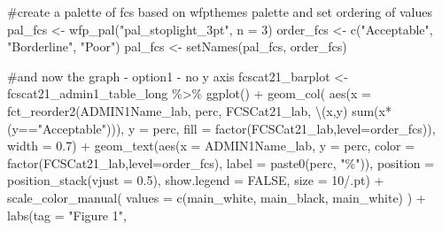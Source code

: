 \documentclass[
  letterpaper,
  DIV=11,
  numbers=noendperiod]{scrreprt}
\newenvironment{Shaded}{\begin{snugshade}}{\end{snugshade}}
\newcommand{\AttributeTok}[1]{\textcolor[rgb]{0.40,0.45,0.13}{#1}}
\newcommand{\CommentTok}[1]{\textcolor[rgb]{0.37,0.37,0.37}{#1}}
\newcommand{\ConstantTok}[1]{\textcolor[rgb]{0.56,0.35,0.01}{#1}}
\newcommand{\DecValTok}[1]{\textcolor[rgb]{0.68,0.00,0.00}{#1}}
\newcommand{\FloatTok}[1]{\textcolor[rgb]{0.68,0.00,0.00}{#1}}
\newcommand{\FunctionTok}[1]{\textcolor[rgb]{0.28,0.35,0.67}{#1}}
\newcommand{\NormalTok}[1]{\textcolor[rgb]{0.00,0.23,0.31}{#1}}
\newcommand{\OtherTok}[1]{\textcolor[rgb]{0.00,0.23,0.31}{#1}}
\newcommand{\SpecialCharTok}[1]{\textcolor[rgb]{0.37,0.37,0.37}{#1}}
\newcommand{\StringTok}[1]{\textcolor[rgb]{0.13,0.47,0.30}{#1}}
\begin{document}
\begin{Shaded}
\begin{Highlighting}[]
\CommentTok{\#create a palette of fcs based on wfpthemes palette and set ordering of values}
\NormalTok{pal\_fcs }\OtherTok{\textless{}{-}} \FunctionTok{wfp\_pal}\NormalTok{(}\StringTok{"pal\_stoplight\_3pt"}\NormalTok{, }\AttributeTok{n =} \DecValTok{3}\NormalTok{)}
\NormalTok{order\_fcs }\OtherTok{\textless{}{-}} \FunctionTok{c}\NormalTok{(}\StringTok{"Acceptable"}\NormalTok{, }\StringTok{"Borderline"}\NormalTok{, }\StringTok{"Poor"}\NormalTok{)}
\NormalTok{pal\_fcs }\OtherTok{\textless{}{-}} \FunctionTok{setNames}\NormalTok{(pal\_fcs, order\_fcs)}

\CommentTok{\#and now the graph {-} option1 {-} no y axis }
\NormalTok{fcscat21\_barplot }\OtherTok{\textless{}{-}}\NormalTok{ fcscat21\_admin1\_table\_long }\SpecialCharTok{\%\textgreater{}\%} 
  \FunctionTok{ggplot}\NormalTok{() }\SpecialCharTok{+}
  \FunctionTok{geom\_col}\NormalTok{(}
    \FunctionTok{aes}\NormalTok{(}\AttributeTok{x =} \FunctionTok{fct\_reorder2}\NormalTok{(ADMIN1Name\_lab,}
\NormalTok{                         perc,  }
\NormalTok{                         FCSCat21\_lab,}
\NormalTok{                         \textbackslash{}(x,y) }\FunctionTok{sum}\NormalTok{(x}\SpecialCharTok{*}\NormalTok{(y}\SpecialCharTok{==}\StringTok{"Acceptable"}\NormalTok{))), }
        \AttributeTok{y =}\NormalTok{ perc,}
        \AttributeTok{fill =} \FunctionTok{factor}\NormalTok{(FCSCat21\_lab,}\AttributeTok{level=}\NormalTok{order\_fcs)), }
    \AttributeTok{width =} \FloatTok{0.7}\NormalTok{) }\SpecialCharTok{+}
  \FunctionTok{geom\_text}\NormalTok{(}\FunctionTok{aes}\NormalTok{(}\AttributeTok{x =}\NormalTok{ ADMIN1Name\_lab,}
                \AttributeTok{y =}\NormalTok{ perc,}
                \AttributeTok{color =} \FunctionTok{factor}\NormalTok{(FCSCat21\_lab,}\AttributeTok{level=}\NormalTok{order\_fcs),}
                \AttributeTok{label =} \FunctionTok{paste0}\NormalTok{(perc, }\StringTok{"\%"}\NormalTok{)),}
            \AttributeTok{position =} \FunctionTok{position\_stack}\NormalTok{(}\AttributeTok{vjust =} \FloatTok{0.5}\NormalTok{),}
            \AttributeTok{show.legend =} \ConstantTok{FALSE}\NormalTok{,}
            \AttributeTok{size =} \DecValTok{10}\SpecialCharTok{/}\NormalTok{.pt) }\SpecialCharTok{+}
  \FunctionTok{scale\_color\_manual}\NormalTok{(}
    \AttributeTok{values =} \FunctionTok{c}\NormalTok{(main\_white, main\_black, main\_white)}
\NormalTok{  ) }\SpecialCharTok{+}
  \FunctionTok{labs}\NormalTok{(}\AttributeTok{tag =} \StringTok{"Figure 1"}\NormalTok{,}

\end{Highlighting}
\end{Shaded}
\end{document}
